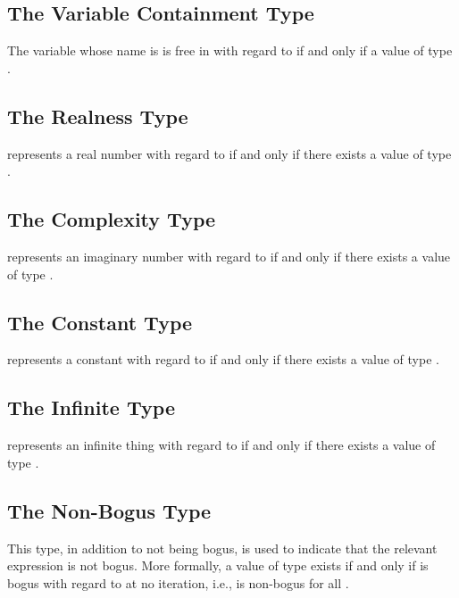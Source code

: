 \documentclass{report}
\begin{document}
\subsection{The Variable Containment Type}
The variable whose name is  is free in  with regard to  if and only if a value of type    .

\subsection{The Realness Type}
 represents a real number with regard to  if and only if there exists a value of type   .

\subsection{The Complexity Type}
 represents an imaginary number with regard to  if and only if there exists a value of type   .

\subsection{The Constant Type}
 represents a constant with regard to  if and only if there exists a value of type   .

\subsection{The Infinite Type}
 represents an infinite thing with regard to  if and only if there exists a value of type   .

\subsection{The Non-Bogus Type}
This type, in addition to not being bogus, is used to indicate that the relevant expression is not bogus.  More formally, a value of type    exists if and only if  is bogus with regard to   at no iteration, i.e.,     is non-bogus for all .
\end{document}
